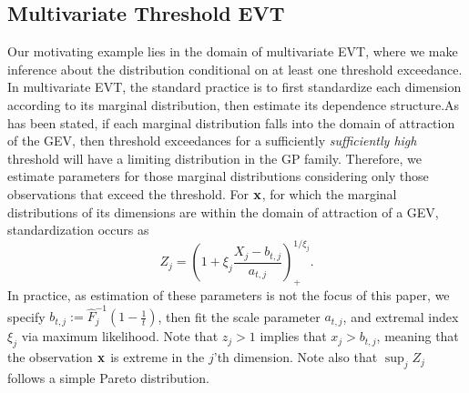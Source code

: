 \subsection{Multivariate Threshold EVT}

Our motivating example lies in the domain of multivariate EVT, where we make inference about the
  distribution conditional on at least one threshold exceedance.  In multivariate EVT, the standard
  practice is to first standardize each dimension according to its marginal distribution, then
  estimate its dependence structure.\needcite  As has been stated, if each marginal distribution falls
  into the domain of attraction of the GEV, then threshold exceedances for a sufficiently
  \emph{sufficiently high} threshold will have a limiting distribution in the GP family\cite{beirlant2006}.
  Therefore, we estimate parameters for those marginal distributions considering only those
  observations that exceed the threshold.  For ${\bf x}$, for which the marginal distributions of its
  dimensions are within the domain of attraction of a GEV, standardization occurs as
  \begin{equation}
    Z_j = \left(1 + \xi_j\frac{X_j - b_{t,j}}{a_{t,j}}\right)_{+}^{1/\xi_j}.
  \end{equation}
  In practice, as estimation of these parameters is not the focus of this paper, we specify 
  $b_{t,j} := \hat{F}_j^{-1}\left(1 - \frac{1}{t}\right)$, then fit the scale parameter $a_{t,j}$,
  and extremal index $\xi_j$ via maximum likelihood.  Note that $z_j > 1$ implies that $x_j > b_{t,j}$,
  meaning that the observation ${\bf x}$ is extreme in the $j$'th dimension.  Note also that
  $\sup_j Z_j$ follows a simple Pareto distribution.

